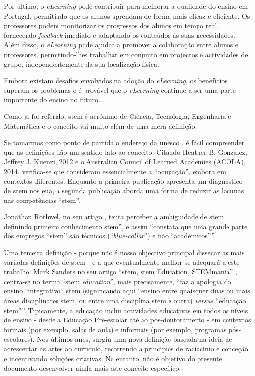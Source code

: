 Por último, o \textit{eLearning} pode contribuir para melhorar a qualidade do ensino em Portugal, permitindo que os alunos aprendam de forma mais eficaz e eficiente. Os professores podem monitorizar os progressos dos alunos em tempo real, fornecendo \textit{feedback} imediato e adaptando os conteúdos às suas necessidades. Além disso, o \textit{eLearning} pode ajudar a promover a colaboração entre alunos e professores, permitindo-lhes trabalhar em conjunto em projectos e actividades de grupo, independentemente da sua localização física.

Embora existam desafios envolvidos na adoção do \textit{eLearning}, os benefícios superam os problemas e é provável que o \textit{eLearning} continue a ser uma parte importante do ensino no futuro.

Como já foi referido, \acrshort{stem} é acrónimo de Ciência, Tecnologia, Engenharia e Matemática e o conceito vai muito além de uma mera definição.

Se tomarmos como ponto de partida o endereço da \acrshort{unesco} \cite{GlossaryUNESCO}, é fácil compreender que as definições dão um sentido lato ao conceito. Citando Heather B. Gonzalez, Jeffrey J. Kuenzi, 2012 e o Australian Council of Learned Academies (ACOLA), 2014, verifica-se que consideram essencialmente a ``ocupação'', embora em contextos diferentes. Enquanto a primeira publicação apresenta um diagnóstico de \acrshort{stem} nos \acrfull{eua}, a segunda publicação aborda uma forma de reduzir as lacunas nas competências ``\acrshort{stem}''.

Jonathan Rothwel, no seu artigo \cite{TheHidde2:online}, tenta perceber a ambiguidade de \acrshort{stem} definindo primeiro conhecimento \acrshort{stem}'', e assim ``constata que uma grande parte dos empregos ``\acrshort{stem}'' são técnicos (``\textit{blue-collar}'') e não ``académicos''''

Uma terceira definição - porque não é nosso objectivo principal dissecar as mais variadas definições de \acrshort{stem} - é a que eventualmente melhor se adequará a este trabalho: Mark Sanders no seu artigo ``\acrshort{stem}, \acrshort{stem} Education, STEMmania'' \cite{TTTSTEMA77:online}, centra-se no termo ``\acrshort{stem} \textit{education}'', mais precisamente, ``faz a apologia do ensino ``integrativo'' \acrshort{stem} (significando aqui ``ensino entre quaisquer duas ou mais áreas disciplinares  \acrshort{stem}, ou entre uma disciplina \acrshort{stem} e outra) \textit{versus} ``educação \acrshort{stem}''''.
Tipicamente, a educação inclui actividades educativas em todos os níveis de ensino - desde a Educação Pré-escolar até ao pós-doutoramento - em contextos formais (por exemplo, salas de aula) e informais (por exemplo, programas pós-escolares). Nos últimos anos, surgiu uma nova definição baseada na ideia de acrescentar as artes ao currículo, recorrendo a princípios de raciocínio e conceção e incentivando soluções criativas. No entanto, não é objetivo do presente documento desenvolver ainda mais este conceito específico.

